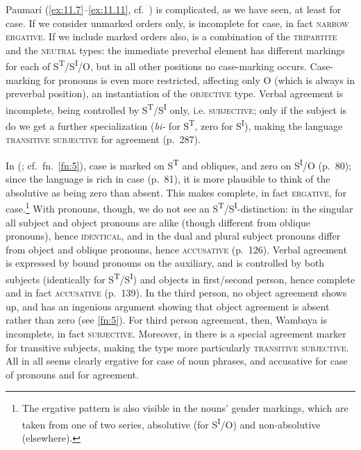 \documentclass[output=paper]{langsci/langscibook}
\begin{document}
Paumarí (\eqref{ex:11.7}--\eqref{ex:11.11}, cf.\ \citealt{ChapmanDerbyshire1991}) is complicated, as we
have seen, at least for case. If we consider unmarked orders only,  is
incomplete for case, in fact \textsc{narrow ergative}. If we include marked
orders also,  is a combination of the \textsc{tripartite} and the
\textsc{neutral} types: the immediate preverbal element has different markings
for each of S\textsuperscript{T}/S\textsuperscript{I}/O, but in all other
positions no case-marking occurs. Case-marking for pronouns is even more
restricted, affecting only O (which is always in preverbal position), an
instantiation of the \textsc{objective} type. Verbal agreement is incomplete,
being controlled by S\textsuperscript{T}/S\textsuperscript{I} only, i.e.
\textsc{subjective}; only if the subject is \Tsg{} do we get a further
specialization (\emph{bi-} for S\textsuperscript{T}, zero for
S\textsuperscript{I}), making the language \textsc{transitive subjective} for
\Tsg{} agreement (p.\ 287).

In  (\citealt{Nordlinger1998}; cf.\ fn.~\ref{fn:5}), case is marked on
S\textsuperscript{T} and obliques, and zero on S\textsuperscript{I}/O (p.\ 80);
since the language is rich in case (p.\ 81), it is more plausible to think of the
absolutive as being zero than absent. This makes  complete, in fact
\textsc{ergative}, for case.\footnote{The ergative pattern is also visible in
the nouns’ gender markings, which are taken from one of two series, absolutive
(for S\textsuperscript{I}/O) and non-absolutive (elsewhere).\label{fn:13}} With
pronouns, though, we do not see an
S\textsuperscript{T}/S\textsuperscript{I}{}-distinction: in the singular all
subject and object pronouns are alike (though different from oblique pronouns),
hence \textsc{identical}, and in the dual and plural subject pronouns differ
from object and oblique pronouns, hence \textsc{accusative} (p.~126). Verbal
agreement is expressed by bound pronouns on the auxiliary, and is controlled by
both subjects (identically for S\textsuperscript{T}/S\textsuperscript{I}) and
objects in first/second person, hence complete and in fact \textsc{accusative}
(p.\ 139). In the third person, no object agreement shows up, and
\citet{Nordlinger1998} has an ingenious argument showing that object agreement
is absent rather than zero (see \cref{fn:5}). For third person agreement, then,
Wambaya is incomplete, in fact \textsc{subjective}. Moreover, in \Tsg{} there
is a special agreement marker for transitive subjects, making the type more
particularly \textsc{transitive subjective}. All in all  seems clearly
ergative for case of noun phrases, and accusative for case of pronouns and for
agreement.
\end{document}
